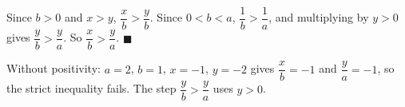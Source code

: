 Since $b>0$ and $x>y$, $\dfrac xb>\dfrac yb$. Since $0<b<a$, $\dfrac1b>\dfrac1a$, and multiplying by $y>0$ gives $\dfrac yb>\dfrac ya$. So $\dfrac xb>\dfrac ya$. $\blacksquare$

Without positivity: $a=2$, $b=1$, $x=-1$, $y=-2$ gives $\dfrac xb=-1$ and $\dfrac ya=-1$, so the strict inequality fails. The step $\dfrac yb>\dfrac ya$ uses $y>0$.
